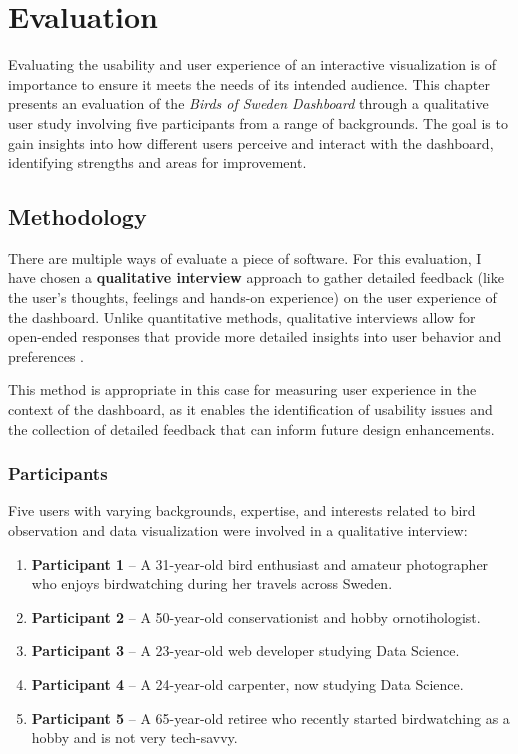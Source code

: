 \chapter{Evaluation}

Evaluating the usability and user experience of an interactive visualization is of importance to ensure it meets the needs of its intended audience. This chapter presents an evaluation of the \textit{Birds of Sweden Dashboard} through a qualitative user study involving five participants from a range of backgrounds. The goal is to gain insights into how different users perceive and interact with the dashboard, identifying strengths and areas for improvement.

\section{Methodology}

There are multiple ways of evaluate a piece of software. For this evaluation, I have chosen a \textbf{qualitative interview} approach to gather detailed feedback (like the user's thoughts, feelings and hands-on experience) on the user experience of the dashboard. Unlike quantitative methods, qualitative interviews allow for open-ended responses that provide more detailed insights into user behavior and preferences \cite{erreyEvaluatingNarrativeVisualization2024,kuterSurveyMethodsQuestionnaires2001}. 

This method is appropriate in this case for measuring user experience in the context of the dashboard, as it enables the identification of usability issues and the collection of detailed feedback that can inform future design enhancements.

\subsection{Participants}

Five users with varying backgrounds, expertise, and interests related to bird observation and data visualization were involved in a qualitative interview:

\begin{enumerate} 
    \item \textbf{Participant 1} -- A 31-year-old bird enthusiast and amateur photographer who enjoys birdwatching during her travels across Sweden.
    \item \textbf{Participant 2} -- A 50-year-old conservationist and hobby ornotihologist.
    \item \textbf{Participant 3} -- A 23-year-old web developer studying Data Science.
    \item \textbf{Participant 4} -- A 24-year-old carpenter, now studying Data Science.
    \item \textbf{Participant 5} -- A 65-year-old retiree who recently started birdwatching as a hobby and is not very tech-savvy.
\end{enumerate}


